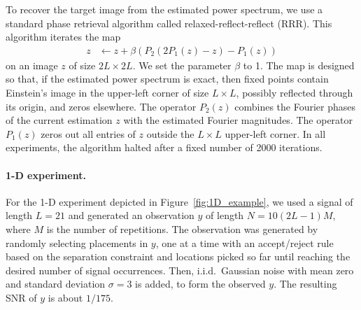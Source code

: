 \documentclass[9pt,twocolumn,twoside,lineno]{pnas-new}
\begin{document}
To recover the target image from the estimated power spectrum, we use a standard phase retrieval algorithm called relaxed-reflect-reflect (RRR). This algorithm iterates the map
\begin{align*}
z & \leftarrow z + \beta (P_2(2P_1(z) - z) - P_1(z))
\end{align*}
on an image $z$ of size $2L\times 2L$.
We set the parameter $\beta$ to 1.
The map is designed so that, if the estimated power spectrum is exact, then fixed points contain Einstein's image in the upper-left corner of size $L \times L$, possibly reflected through its origin, and zeros elsewhere. The operator $P_2(z)$ combines the Fourier phases of  the current estimation $z$ with the estimated Fourier magnitudes. The operator $P_1(z)$ zeros out all entries of $z$ outside the $L\times L$ upper-left corner. In all experiments, the algorithm halted after a fixed number of 2000 iterations.
%




\paragraph{1-D experiment.}
For the 1-D experiment depicted in Figure~\ref{fig:1D_example}, we used a signal of length $L=21$ and generated an observation $y$ of length $N = 10(2L-1)M$, where $M$ is the number of repetitions. 
The observation was generated by randomly selecting placements in $y$, one at a time with an accept/reject rule based on the separation constraint and locations picked so far until reaching the desired number of signal occurrences. Then, i.i.d.\ Gaussian noise with mean zero and standard deviation $\sigma = 3$ is added, to form the observed $y$. The resulting SNR of $y$ is about $1/175$.
\end{document}
